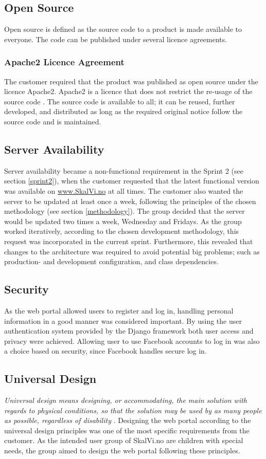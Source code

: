 \subsection{Open Source}
Open source is defined as the source code to a product is made available to everyone. The code can be published under several licence agreements.

\subsubsection{Apache2 Licence Agreement}
The customer required that the product was published as open source under the licence Apache2. Apache2 is a licence that does not restrict the re-usage of the source code \cite{apache2}. The source code is available to all; it can be reused, further developed, and distributed as long as the required original notice follow the source code and is maintained. 

\subsection{Server Availability}
Server availability became a non-functional requirement in the Sprint 2 (see section \ref{sprint2}), when the customer requested that the latest functional version was available on \url{www.SkalVi.no} at all times. The customer also wanted the server to be updated at least once a week, following the principles of the chosen methodology (see section \ref{methodology}). The group decided that the server would be updated two times a week, Wednesday and Fridays. As the group worked iteratively, according to the chosen development methodology, this request was incorporated in the current sprint. Furthermore, this revealed that changes to the architecture was required to avoid potential big problems; such as production- and development configuration, and class dependencies.

\subsection{Security}
As the web portal allowed users to register and log in, handling personal information in a good manner was considered important. By using the user authentication system provided by the Django framework both user access and privacy were achieved. Allowing user to use Facebook accounts to log in was also a choice based on security, since Facebook handles secure log in.


\subsection{Universal Design}
\label{universalDesign}
\textit{Universal design means designing, or accommodating, the main solution with regards to physical conditions, so that the solution may be used by as many people as possible, regardless of disability} \cite{Difi}. Designing the web portal according to the universal design principles was one of the most specific requirements from the customer. As the intended user group of SkalVi.no are children with special needs, the group aimed to design the web portal following these principles. 


